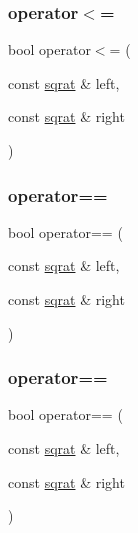 \mbox{\label{classsqrat_ae33aee8490a3137fb967fbd52b100f6d}} 
\subsubsection{\texorpdfstring{operator$<$=}{operator<=}\hspace{0.1cm}{\footnotesize\ttfamily [2/2]}}
{\footnotesize\ttfamily bool operator$<$= (\begin{DoxyParamCaption}\item[{const \mbox{\hyperlink{classsqrat}{sqrat}} \&}]{left,  }\item[{const \mbox{\hyperlink{classsqrat}{sqrat}} \&}]{right }\end{DoxyParamCaption})\hspace{0.3cm}{\ttfamily [friend]}}

\mbox{\label{classsqrat_aa31a4a7298644b244db89e455265c946}} 
\subsubsection{\texorpdfstring{operator==}{operator==}\hspace{0.1cm}{\footnotesize\ttfamily [1/2]}}
{\footnotesize\ttfamily bool operator== (\begin{DoxyParamCaption}\item[{const \mbox{\hyperlink{classsqrat}{sqrat}} \&}]{left,  }\item[{const \mbox{\hyperlink{classsqrat}{sqrat}} \&}]{right }\end{DoxyParamCaption})\hspace{0.3cm}{\ttfamily [friend]}}

\mbox{\label{classsqrat_aa31a4a7298644b244db89e455265c946}} 
\subsubsection{\texorpdfstring{operator==}{operator==}\hspace{0.1cm}{\footnotesize\ttfamily [2/2]}}
{\footnotesize\ttfamily bool operator== (\begin{DoxyParamCaption}\item[{const \mbox{\hyperlink{classsqrat}{sqrat}} \&}]{left,  }\item[{const \mbox{\hyperlink{classsqrat}{sqrat}} \&}]{right }\end{DoxyParamCaption})\hspace{0.3cm}{\ttfamily [friend]}}

